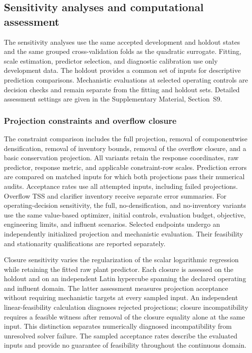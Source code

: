 \documentclass[a4paper,fleqn]{cas-sc}
\begin{document}
\subsection{Sensitivity analyses and computational assessment}
\label{sec:sensitivity}

The sensitivity analyses use the same accepted development and holdout states and the same grouped cross-validation folds as the quadratic surrogate. Fitting, scale estimation, predictor selection, and diagnostic calibration use only development data. The holdout provides a common set of inputs for descriptive prediction comparisons. Mechanistic evaluations at selected operating controls are decision checks and remain separate from the fitting and holdout sets. Detailed assessment settings are given in the Supplementary Material, Section~S9.

\subsubsection{Projection constraints and overflow closure}

The constraint comparison includes the full projection, removal of componentwise densification, removal of inventory bounds, removal of the overflow closure, and a basic conservation projection. All variants retain the response coordinates, raw predictor, response metric, and applicable constraint-row scales. Prediction errors are compared on matched inputs for which both projections pass their numerical audits. Acceptance rates use all attempted inputs, including failed projections. Overflow TSS and clarifier inventory receive separate error summaries. For operating-decision sensitivity, the full, no-densification, and no-inventory variants use the same value-based optimizer, initial controls, evaluation budget, objective, engineering limits, and influent scenarios. Selected endpoints undergo an independently initialized projection and mechanistic evaluation. Their feasibility and stationarity qualifications are reported separately.

Closure sensitivity varies the regularization of the scalar logarithmic regression while retaining the fitted raw plant predictor. Each closure is assessed on the holdout and on an independent Latin hypercube spanning the declared operating and influent domain. The latter assessment measures projection acceptance without requiring mechanistic targets at every sampled input. An independent linear-feasibility calculation diagnoses rejected projections; closure incompatibility requires a feasible witness after removal of the closure equality alone at the same input. This distinction separates numerically diagnosed incompatibility from unresolved solver failure. The sampled acceptance rates describe the evaluated inputs and provide no guarantee of feasibility throughout the continuous domain.
\end{document}
